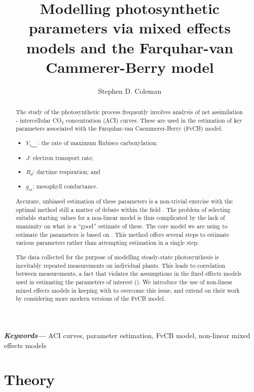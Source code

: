\documentclass[11pt]{article} %
\title{Modelling photosynthetic parameters via mixed effects models and the Farquhar-van Cammerer-Berry model}
\author{Stephen D. Coleman}
\providecommand{\keywords}[1]
{
  \small	
  \textbf{\textit{Keywords---}} #1
}
\begin{document}
 \pgfplotsset{compat=1.16}
\maketitle

\begin{abstract}
The study of the photosynthetic process frequently involves analysis of net assimilation - intercellular CO$_2$ concentration (ACI) curves. These are used in the estimation of key parameters associated with the Farquhar-van Caemmerer-Berry (FvCB) \cite{Farquharbiochemicalmodelphotosynthetic1980} model:
\begin{itemize}
 \item $V_{c_{max}}$: the rate of maximum Rubisco carboxylation;
 \item $J$: electron transport rate;
 \item $R_d$: daytime respiration; and
 \item $g_m$: mesophyll conductance.
\end{itemize}
Accurate, unbiased estimation of these parameters is a non-trivial exercise with the optimal method still a matter of debate within the field \cite{Moualeu-Nganguenewmethodestimate2017}\cite{YinTheoreticalreconsiderationswhen2009}\cite{QianEstimationphotosynthesisparameters2012}. The problem of selecting suitable starting values for a non-linear model is thus complicated by the lack of unanimity on what is a ``good'' estimate of these. The core model we are using to estimate the parameters is based on \citet{YinUsingcombinedmeasurements2009}. This method offers several steps to estimate various parameters rather than attempting estimation in a single step. %

The data collected for the purpose of modelling steady-state photosynthesis is inevitably repeated measurements on individual plants. This leads to correlation between measurements, a fact that violates the assumptions in the fixed effects models used in estimating the parameters of interest (\cite{DuursmaPlantecophysPackageAnalysing2015}\cite{BellasioExceltoolderiving2016}). We introduce the use of non-linear mixed effects models in keeping with \citet{QianEstimationphotosynthesisparameters2012} to overcome this issue, and extend on their work by considering more modern versions of the FvCB model.
\end{abstract}
\keywords{ACI curves, parameter estimation, FvCB model, non-linear mixed effects models}

\section{Theory}
\end{document}
